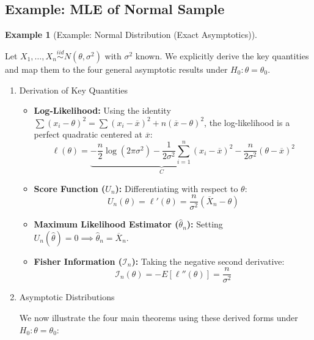 \documentclass[
  letterpaper,
  DIV=11,
  numbers=noendperiod]{scrreprt}
\renewcommand{\[}{\begin{equation}}
\renewcommand{\]}{\end{equation}}
\theoremstyle{definition}
\theoremstyle{plain}
\theoremstyle{plain}
\theoremstyle{plain}
\theoremstyle{definition}
\newtheorem{example}{Example}[chapter]
\theoremstyle{plain}
\theoremstyle{remark}
\begin{document}
\subsection{Example: MLE of Normal
Sample}\label{example-mle-of-normal-sample}

\begin{example}[Example: Normal Distribution (Exact
Asymptotics)]\protect\hypertarget{exm-normal-mle-asymptotics}{}\label{exm-normal-mle-asymptotics}

Let \(X_1, \dots, X_n \overset{iid}{\sim} N(\theta, \sigma^2)\) with
\(\sigma^2\) known. We explicitly derive the key quantities and map them
to the four general asymptotic results under \(H_0: \theta = \theta_0\).

\begin{enumerate}
\def\labelenumi{\arabic{enumi}.}
\item
  Derivation of Key Quantities

  \begin{itemize}
  \item
    \textbf{Log-Likelihood:} Using the identity
    \(\sum (x_i - \theta)^2 = \sum (x_i - \overline{x})^2 + n(\overline{x} - \theta)^2\),
    the log-likelihood is a perfect quadratic centered at
    \(\overline{x}\): \[
      \ell(\theta) = \underbrace{-\frac{n}{2}\log(2\pi\sigma^2) - \frac{1}{2\sigma^2}\sum_{i=1}^n (x_i - \overline{x})^2}_{C} - \frac{n}{2\sigma^2}(\theta - \overline{x})^2
      \]
  \item
    \textbf{Score Function (\(U_n\)):} Differentiating with respect to
    \(\theta\): \[
      U_n(\theta) = \ell'(\theta) = \frac{n}{\sigma^2}(\overline{X}_n - \theta)
      \]
  \item
    \textbf{Maximum Likelihood Estimator (\(\hat{\theta}_n\)):} Setting
    \(U_n(\hat{\theta}) = 0 \implies \hat{\theta}_n = \overline{X}_n\).
  \item
    \textbf{Fisher Information (\(\mathcal{I}_n\)):} Taking the negative
    second derivative: \[
      \mathcal{I}_n(\theta) = -E[\ell''(\theta)] = \frac{n}{\sigma^2}
      \]
  \end{itemize}
\item
  Asymptotic Distributions

  We now illustrate the four main theorems using these derived forms
  under \(H_0: \theta = \theta_0\):


\end{enumerate}
\end{example}
\end{document}
